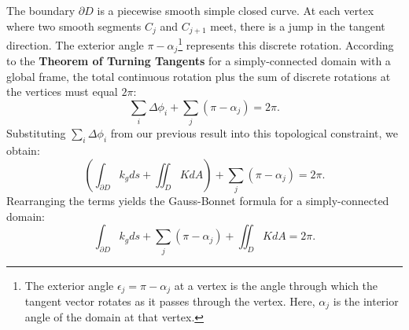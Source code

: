 \begin{solution}
The boundary $\partial D$ is a piecewise smooth simple closed curve. At each vertex where two smooth segments $C_j$ and $C_{j+1}$ meet, there is a jump in the tangent direction. The exterior angle $\pi - \alpha_j$\footnote{The exterior angle $\epsilon_j = \pi - \alpha_j$ at a vertex is the angle through which the tangent vector rotates as it passes through the vertex. Here, $\alpha_j$ is the interior angle of the domain at that vertex.} represents this discrete rotation. According to the \textbf{Theorem of Turning Tangents} for a simply-connected domain with a global frame, the total continuous rotation plus the sum of discrete rotations at the vertices must equal $2\pi$:
\[ \sum_i \Delta \phi_i + \sum_j (\pi - \alpha_j) = 2\pi. \]
Substituting $\sum_i \Delta \phi_i$ from our previous result into this topological constraint, we obtain:
\[ \left( \int_{\partial D} k_g ds + \iint_D K dA \right) + \sum_j (\pi - \alpha_j) = 2\pi. \]
Rearranging the terms yields the Gauss-Bonnet formula for a simply-connected domain:
\[ \int_{\partial D} k_g ds + \sum_j (\pi - \alpha_j) + \iint_D K dA = 2\pi. \]
\end{solution}
